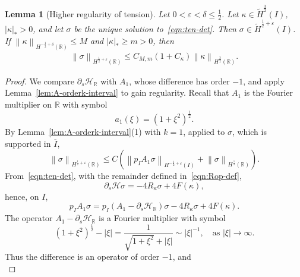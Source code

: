 \documentclass[11pt,reqno]{amsart}
\theoremstyle{plain}
\newtheorem{lemma}[theorem]{Lemma}
\theoremstyle{definition}
\numberwithin{equation}{section}
\newcommand{\paren}[1]{\left(#1\right)}
\newcommand{\p}{\partial}
\newcommand{\mc}[1]{\mathcal{#1}}
\newcommand{\wt}[1]{\widetilde{#1}}
\newcommand{\abs}[1]{\left\lvert #1 \right\rvert}
\newcommand{\norm}[1]{\left\lVert #1 \right\rVert}
\newcommand{\R}{\mathbb{R}}
\newcommand{\hi}[1]{H^{#1}(I)}
\newcommand{\thi}[1]{\wt H^{#1}(I)}
\newcommand{\hr}[1]{H^{#1}(\R)}
\begin{document}
\begin{lemma}[Higher regularity of tension]\label{sigma-est-F-higher}
Let $0 < \varepsilon<\delta\le \frac{1}{2}$.
Let $\kappa\in\thi{\frac{3}{2}}$, $\abs{\kappa}_* > 0$, and let $\sigma$ be the
unique solution to~\eqref{eqn:ten-det}. Then $\sigma\in \thi{\frac{1}{2}+\varepsilon}$.
If $\norm{\kappa}_{\hr{-\frac12+\delta}}\le M$ and $\abs{\kappa}_*\ge m>0$, then
\begin{equation}\label{eqn:tension-higher-bound}
\begin{aligned}
    \norm{\sigma}_{\hr{\frac{1}{2}+\varepsilon}}
    \le C_{M,m}(1+C_\kappa)\norm{\kappa}_{\hr{\frac{3}{2}}}.
\end{aligned}
\end{equation}
\end{lemma}
\begin{proof}
We compare $\p_s\mc H_{\R}$ with $A_1$, whose difference has order $-1$,
and apply Lemma~\ref{lem:A-orderk-interval} to gain regularity.
Recall that $A_1$ is the Fourier multiplier on $\R$ with symbol
\begin{equation}
    a_1(\xi) = (1+\xi^2)^{\frac{1}{2}}.
\end{equation}
By Lemma~\ref{lem:A-orderk-interval}(1) with $k=1$, applied to $\sigma$,
which is supported in $\overline I$,
\begin{equation}\label{eqn:sigma-A-priori}
    \norm{\sigma}_{\hr{\frac{1}{2}+\varepsilon}}
    \le C\left(
    \norm{p_I A_1\sigma}_{\hi{-\frac{1}{2}+\varepsilon}}
    +\norm{\sigma}_{\hr{\frac{1}{2}}}
    \right).
\end{equation}
From~\eqref{eqn:ten-det}, with the remainder defined in~\eqref{eqn:Rop-def},
\begin{equation}
    \p_s\mc H \sigma = -4R_\kappa\sigma + 4F(\kappa),
\end{equation}
hence, on $I$,
\begin{equation}\label{eqn:sigma-principal-decomposition}
    p_I A_1\sigma
    =p_I\paren{A_1-\p_s\mc H_{\R}}\sigma
    -4R_\kappa\sigma+4F(\kappa).
\end{equation}
The operator $A_1-\p_s\mc H_{\R}$ is a Fourier multiplier with symbol
\begin{equation}
    (1+\xi^2)^{\frac{1}{2}}-\abs{\xi} = \frac{1}{\sqrt{1+\xi^2}+\abs{\xi}} \sim \abs{\xi}^{-1},
    \quad \text{as } \abs{\xi}\to \infty.
\end{equation}
Thus the difference is an operator of order $-1$, and
\begin{equation}\label{eqn:sigma-lower-order-bound}

\end{equation}
\end{proof}
\end{document}
